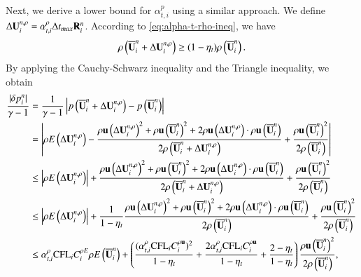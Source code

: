 \newcommand{\uincT}{\inc\U_i^{n,\rho}}
Next, we derive a lower bound for $\alpha_{t,i}^{p}$ using a similar approach.
We define $\mathrm\Delta\mathbf{U}_i^{n,\rho} =\alpha_{t,i}^{\rho} \mathrm\Delta t_{max} \mathbf{R}^n_i$.
According to \eqref{eq:alpha-t-rho-ineq}, we have 
\begin{equation}
    \rho\left(\UM^n_i+\uincT  \right) \geq (1-\eta_t)\rho\left(\UM^n_i\right).
\end{equation}
By applying the Cauchy-Schwarz inequality and the Triangle inequality, we obtain
\begin{equation}
    \begin{aligned}
        \dfrac{|\delta p_i^n|}{\gamma-1} 
        &=  \dfrac{1}{\gamma-1} \left| p \left(\UM^n_i + \inc\U_i^{n,\rho}\right) -  p \left(\UM^n_i\right) \right| \\
        &=  \left| \rho E\left( \uincT \right) 
         - \frac{
         \rho\uv\left(\uincT\right)^2
         +
         \rho\uv\left(\UM^n_i\right)^2
         +
         2\rho\uv\left(\uincT\right)\cdot\rho\uv\left(\UM^n_i\right)
         }{
         2\rho\left(\UM^n_i+\uincT  \right)
         }
         + \frac{ \rho\uv\left(\UM^n_i\right)^2}{2\rho\left(\UM^n_i\right)}
        \right| \\
        &\leq  \left| \rho E\left( \uincT \right) \right|
         +
         \dfrac{
         \rho\uv\left(\uincT\right)^2
         +
         \rho\uv\left(\UM^n_i\right)^2
         +
         2\rho\uv\left(\uincT\right)\cdot\rho\uv\left(\UM^n_i\right)
         }{
         2\rho\left(\UM^n_i+\uincT  \right)
         }
         +
          \frac{ \rho\uv\left(\UM^n_i\right)^2}{2\rho\left(\UM^n_i\right)} \\
        &\leq  \left| \rho E\left( \uincT \right) \right|
         +
         \frac{1}{1-\eta_t}
         \frac{
         \rho\uv\left(\uincT\right)^2
         +
         \rho\uv\left(\UM^n_i\right)^2
         +
         2\rho\uv\left(\uincT\right)\cdot\rho\uv\left(\UM^n_i\right)
         }{
         2\rho\left(\UM^n_i \right)
         }
         +
          \frac{ \rho\uv\left(\UM^n_i\right)^2}{2\rho\left(\UM^n_i\right)} \\
        &\leq \alpha_{t,i}^\rho\CFL_i C^{\rho E}_i  \rho E\left( \UM^n_i \right) 
        +\left(
        \frac{(\alpha_{t,i}^\rho\CFL_i C^{\rho \uv}_i)^2}{1-\eta_t}
        +\frac{2\alpha_{t,i}^\rho\CFL_i C^{\rho \uv}_i}{1-\eta_t}
        + \frac{2-\eta_t}{1-\eta_t}
        \right)
        \frac{ \rho\uv\left(\UM^n_i\right)^2}{2\rho\left(\UM^n_i\right)},
    \end{aligned}
\end{equation}
